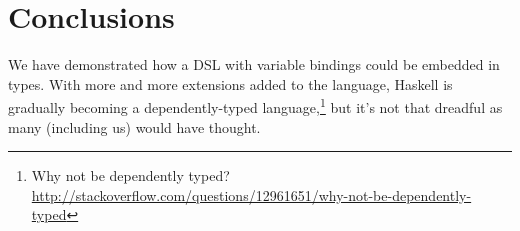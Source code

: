 
\section{Conclusions}
\label{sec:conclusions}

We have demonstrated how a DSL with variable bindings could be embedded in types.
With more and more extensions added to the language, Haskell is gradually
 becoming a dependently-typed language,\footnote{Why not be dependently typed? \url{http://stackoverflow.com/questions/12961651/why-not-be-dependently-typed}}
 but it's not that dreadful as many (including us) would have thought.
